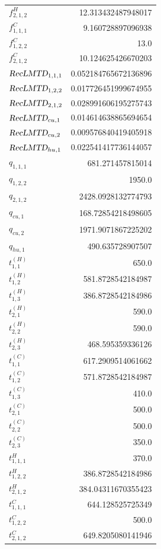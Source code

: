 \documentclass{article}%
\begin{document}
\begin{multicols*}{3}
\begin{supertabular}{lr}
	$f_{2,1,2}^{H}$ & 12.313432487948017 \\%
	$f_{1,1,1}^{C}$ & 9.160728897096938 \\%
	$f_{1,2,2}^{C}$ & 13.0 \\%
	$f_{2,1,2}^{C}$ & 10.124625426670203 \\%
	$\textsl{RecLMTD}_{1,1,1}$ & 0.052184765672136896 \\%
	$\textsl{RecLMTD}_{1,2,2}$ & 0.017726451999674955 \\%
	$\textsl{RecLMTD}_{2,1,2}$ & 0.028991606195275743 \\%
	$\textsl{RecLMTD}_{cu,1}$ & 0.014614638865694654 \\%
	$\textsl{RecLMTD}_{cu,2}$ & 0.009576840419405918 \\%
	$\textsl{RecLMTD}_{hu,1}$ & 0.022541417736144057 \\%
	$q_{1,1,1}$ & 681.271457815014 \\%
	$q_{1,2,2}$ & 1950.0 \\%
	$q_{2,1,2}$ & 2428.0928132774793 \\%
	$q_{cu,1}$ & 168.72854218498605 \\%
	$q_{cu,2}$ & 1971.9071867225202 \\%
	$q_{hu,1}$ & 490.635728907507 \\%
	$t_{1,1}^{(H)}$ & 650.0 \\%
	$t_{1,2}^{(H)}$ & 581.8728542184987 \\%
	$t_{1,3}^{(H)}$ & 386.8728542184986 \\%
	$t_{2,1}^{(H)}$ & 590.0 \\%
	$t_{2,2}^{(H)}$ & 590.0 \\%
	$t_{2,3}^{(H)}$ & 468.595359336126 \\%
	$t_{1,1}^{(C)}$ & 617.2909514061662 \\%
	$t_{1,2}^{(C)}$ & 571.8728542184987 \\%
	$t_{1,3}^{(C)}$ & 410.0 \\%
	$t_{2,1}^{(C)}$ & 500.0 \\%
	$t_{2,2}^{(C)}$ & 500.0 \\%
	$t_{2,3}^{(C)}$ & 350.0 \\%
	$t_{1,1,1}^{H}$ & 370.0 \\%
	$t_{1,2,2}^{H}$ & 386.8728542184986 \\%
	$t_{2,1,2}^{H}$ & 384.04311670355423 \\%
	$t_{1,1,1}^{C}$ & 644.128525725349 \\%
	$t_{1,2,2}^{C}$ & 500.0 \\%
	$t_{2,1,2}^{C}$ & 649.8205080141946 \\%

\end{supertabular}
\end{multicols*}
\end{document}
